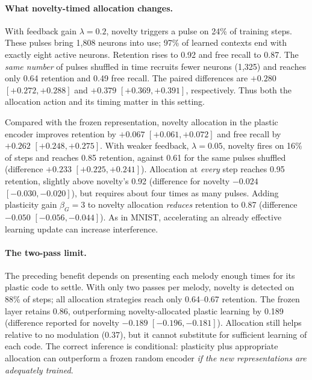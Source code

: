 \documentclass[11pt,a4paper]{article}
\begin{document}
\paragraph{What novelty-timed allocation changes.}
With feedback gain $\lambda=0.2$, novelty triggers a pulse on 24\% of training steps. These pulses bring 1{,}808 neurons into use; 97\% of learned contexts end with exactly eight active neurons. Retention rises to 0.92 and free recall to 0.87. The \emph{same number} of pulses shuffled in time recruits fewer neurons (1{,}325) and reaches only 0.64 retention and 0.49 free recall. The paired differences are $+0.280$ $[+0.272,+0.288]$ and $+0.379$ $[+0.369,+0.391]$, respectively. Thus both the allocation action and its timing matter in this setting.

Compared with the frozen representation, novelty allocation in the plastic encoder improves retention by $+0.067$ $[+0.061,+0.072]$ and free recall by $+0.262$ $[+0.248,+0.275]$. With weaker feedback, $\lambda=0.05$, novelty fires on 16\% of steps and reaches 0.85 retention, against 0.61 for the same pulses shuffled (difference $+0.233$ $[+0.225,+0.241]$). Allocation at \emph{every} step reaches 0.95 retention, slightly above novelty's 0.92 (difference for novelty $-0.024$ $[-0.030,-0.020]$), but requires about four times as many pulses. Adding plasticity gain $\beta_G=3$ to novelty allocation \emph{reduces} retention to 0.87 (difference $-0.050$ $[-0.056,-0.044]$). As in MNIST, accelerating an already effective learning update can increase interference.

\paragraph{The two-pass limit.}
The preceding benefit depends on presenting each melody enough times for its plastic code to settle. With only two passes per melody, novelty is detected on 88\% of steps; all allocation strategies reach only 0.64--0.67 retention. The frozen layer retains 0.86, outperforming novelty-allocated plastic learning by 0.189 (difference reported for novelty $-0.189$ $[-0.196,-0.181]$). Allocation still helps relative to no modulation (0.37), but it cannot substitute for sufficient learning of each code. The correct inference is conditional: plasticity plus appropriate allocation can outperform a frozen random encoder \emph{if the new representations are adequately trained}.
\end{document}
